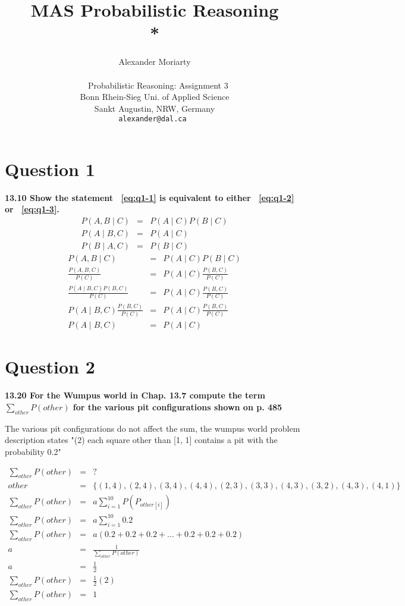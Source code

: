 \documentclass[a4paper, 12 pt, conference, onecolumn]{IEEEconf}
\title{\LARGE \bf
MAS Probabilistic Reasoning\\* 
}
\author{Alexander Moriarty\\~\\~
        Probabilistic Reasoning: Assignment 3\\
        Bonn Rhein-Sieg Uni. of Applied Science\\ 
        Sankt Augustin, NRW, Germany\\
        \tt\small alexander@dal.ca
}
\begin{document}
\maketitle

\section{Question 1}
\textbf{13.10 Show the statement ~\ref{eq:q1-1} is equivalent to either ~\ref{eq:q1-2} or ~\ref{eq:q1-3}.}
\begin{eqnarray}
P(A, B \mid C) &=& P(A \mid C) P(B \mid C) \label{eq:q1-1} \\
P(A \mid B, C) &=& P(A \mid C) \label{eq:q1-2} \\
P(B \mid A, C) &=& P(B \mid C) \label{eq:q1-3}
\end{eqnarray}
\noindent\makebox[\linewidth]{\rule{\linewidth}{0.1pt}} 
\setcounter{equation}{0}
\begin{eqnarray}
P(A, B \mid C) &=& P(A \mid C) P(B \mid C) \\
\frac{P(A, B, C)}{P(C)} &=& P(A \mid C)\frac{P(B, C)}{P(C)} \\
\frac{P(A \mid B, C) P(B, C)}{P(C)} &=& P(A \mid C)\frac{P(B, C)}{P(C)} \\
P(A \mid B, C)\frac{P(B, C)}{P(C)} &=& P(A \mid C)\frac{P(B, C)}{P(C)} \\
P(A \mid B, C) &=& P(A \mid C)
\end{eqnarray}


\newpage
\setcounter{paragraph}{0}
\setcounter{equation}{0}
\section{Question 2}
\textbf{13.20 For the Wumpus world in Chap. 13.7 compute the term $\sum\limits_{other}P(other)$ for the various pit configurations shown on p. 485}

The various pit configurations do not affect the sum, the wumpus world problem description states "(2) each square other than [1, 1] contains a pit with the probability 0.2" 

\begin{eqnarray}
\sum\limits_{other} P(other) &=& ? \\
other &=& \lbrace(1,4),(2,4),(3,4),(4,4),(2,3),(3,3),(4,3),(3,2),(4,3),(4,1)\rbrace \\
\sum\limits_{other} P(other) &=& a \sum\limits_{i=1}^{10} P ( P_{other\left[ i \right] } ) \\
\sum\limits_{other} P(other) &=& a \sum\limits_{i=1}^{10} 0.2  \\
\sum\limits_{other} P(other) &=& a ( 0.2+0.2+0.2+...+0.2+0.2+0.2 ) \\
a &=& \frac{1}{\sum\limits_{other} P(other)} \\
a &=& \frac{1}{2}\\
\sum\limits_{other} P(other) &=& \frac{1}{2} ( 2 )  \\
\sum\limits_{other} P(other) &=& 1
\end{eqnarray}
\end{document}
